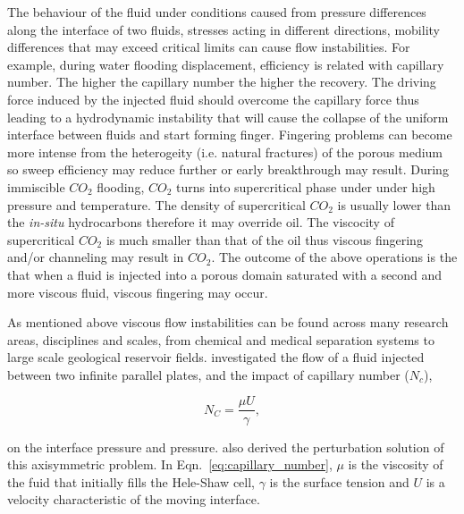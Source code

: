 \documentclass[preprint,authoryear,12pt]{elsarticle}
\begin{document}
\medskip
The behaviour of the fluid under conditions caused from pressure differences along the interface of two fluids, stresses acting in different directions, mobility differences that may exceed critical limits can cause flow instabilities. For example, during water flooding displacement, efficiency is related with capillary number. The higher the capillary number the higher the recovery. The driving force induced by the injected fluid should overcome the capillary force thus leading to a hydrodynamic instability that will cause the collapse of the uniform interface between fluids and start forming finger. Fingering problems can become more intense from the heterogeity (i.e. natural fractures) of the porous medium so sweep efficiency may reduce further or early breakthrough may result. During immiscible $CO_{2}$ flooding, $CO_{2}$ turns into supercritical phase under under high pressure and temperature. The density of supercritical $CO_{2}$ is usually lower than the \textit{in-situ} hydrocarbons therefore it may override oil. The viscocity of supercritical $CO_{2}$ is much smaller than that of the oil thus viscous fingering and/or channeling may result in $CO_{2}$. The outcome of the above operations is the that when a fluid is injected into a porous domain saturated with a second and more viscous fluid, viscous fingering may occur.  

\medskip
As mentioned above viscous flow instabilities can be found across many research areas, disciplines and scales, from chemical and medical separation systems to large scale geological reservoir fields. \citet{muskat_1934} investigated the flow of a fluid injected between two infinite parallel plates, and the impact of capillary number ($N_{c}$),
 
\begin{equation}
N_{C} = \frac{\mu U}{\gamma},
\label{eq:capillary_number}
\end{equation}

\noindent on the interface pressure and pressure. \citet{muskat_1934} also derived the perturbation solution of this axisymmetric problem. In Eqn.~\ref{eq:capillary_number}, $\mu$ is the viscosity of the fuid that initially fills the Hele-Shaw cell, $\gamma$ is the surface tension and $U$ is a velocity characteristic of the moving interface.
\end{document}
